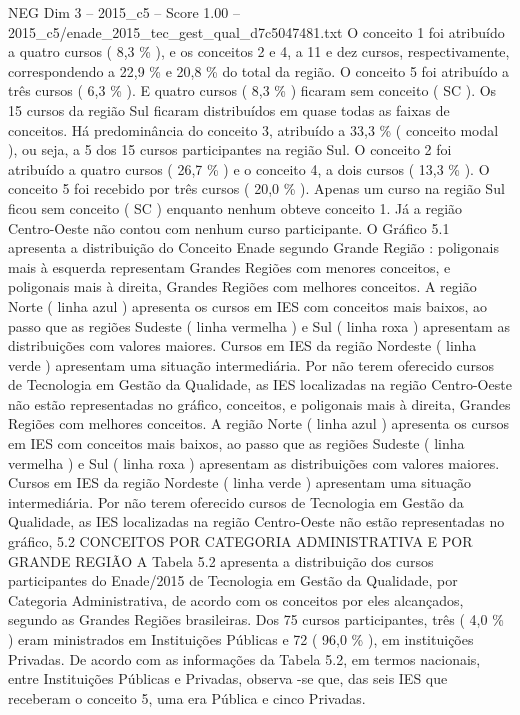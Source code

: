 \begin{textsample}{NEG Dim 3 – 2015\_c5 – Score 1.00 – 2015\_c5/enade\_2015\_tec\_gest\_qual\_d7c5047481.txt}
O conceito 1 foi atribuído a quatro cursos ( 8,3 \% ), e os conceitos 2 e 4, a 11 e dez cursos, respectivamente, correspondendo a 22,9 \% e 20,8 \% do total da região.
O conceito 5 foi atribuído a três cursos ( 6,3 \% ).
E quatro cursos ( 8,3 \% ) ficaram sem conceito ( SC ).
Os 15 cursos da região Sul ficaram distribuídos em quase todas as faixas de conceitos.
Há predominância do conceito 3, atribuído a 33,3 \% ( conceito modal ), ou seja, a 5 dos 15 cursos participantes na região Sul.
O conceito 2 foi atribuído a quatro cursos ( 26,7 \% ) e o conceito 4, a dois cursos ( 13,3 \% ).
O conceito 5 foi recebido por três cursos ( 20,0 \% ).
Apenas um curso na região Sul ficou sem conceito ( SC ) enquanto nenhum obteve conceito 1.
Já a região Centro-Oeste não contou com nenhum curso participante.
O Gráfico 5.1 apresenta a distribuição do Conceito Enade segundo Grande Região : poligonais mais à esquerda representam Grandes Regiões com menores conceitos, e poligonais mais à direita, Grandes Regiões com melhores conceitos.
A região Norte ( linha azul ) apresenta os cursos em IES com conceitos mais baixos, ao passo que as regiões Sudeste ( linha vermelha ) e Sul ( linha roxa ) apresentam as distribuições com valores maiores.
Cursos em IES da região Nordeste ( linha verde ) apresentam uma situação intermediária.
Por não terem oferecido cursos de Tecnologia em Gestão da Qualidade, as IES localizadas na região Centro-Oeste não estão representadas no gráfico, conceitos, e poligonais mais à direita, Grandes Regiões com melhores conceitos.
A região Norte ( linha azul ) apresenta os cursos em IES com conceitos mais baixos, ao passo que as regiões Sudeste ( linha vermelha ) e Sul ( linha roxa ) apresentam as distribuições com valores maiores.
Cursos em IES da região Nordeste ( linha verde ) apresentam uma situação intermediária.
Por não terem oferecido cursos de Tecnologia em Gestão da Qualidade, as IES localizadas na região Centro-Oeste não estão representadas no gráfico, 5.2 CONCEITOS POR CATEGORIA ADMINISTRATIVA E POR GRANDE REGIÃO A Tabela 5.2 apresenta a distribuição dos cursos participantes do Enade/2015 de Tecnologia em Gestão da Qualidade, por Categoria Administrativa, de acordo com os conceitos por eles alcançados, segundo as Grandes Regiões brasileiras.
Dos 75 cursos participantes, três ( 4,0 \% ) eram ministrados em Instituições Públicas e 72 ( 96,0 \% ), em instituições Privadas.
De acordo com as informações da Tabela 5.2, em termos nacionais, entre Instituições Públicas e Privadas, observa -se que, das seis IES que receberam o conceito 5, uma era Pública e cinco Privadas.

\end{textsample}
